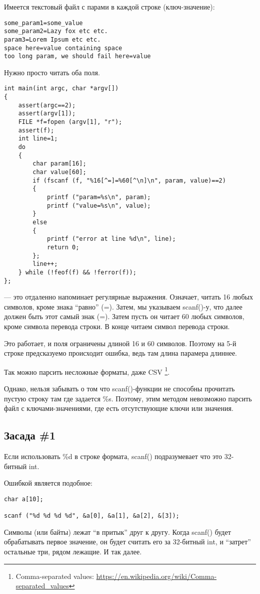 Имеется текстовый файл с парами в каждой строке (ключ-значение):

\begin{lstlisting}
some_param1=some_value
some_param2=Lazy fox etc etc.
param3=Lorem Ipsum etc etc.
space here=value containing space
too long param, we should fail here=value
\end{lstlisting}

Нужно просто читать оба поля.

\begin{lstlisting}
int main(int argc, char *argv[])
{
	assert(argc==2);
	assert(argv[1]);
	FILE *f=fopen (argv[1], "r");
	assert(f);
	int line=1;
	do
	{
		char param[16];
		char value[60];
		if (fscanf (f, "%16[^=]=%60[^\n]\n", param, value)==2)
		{
			printf ("param=%s\n", param);
			printf ("value=%s\n", value);
		}
		else
		{
			printf ("error at line %d\n", line);
			return 0;
		};
		line++;
	} while (!feof(f) && !ferror(f));
};
\end{lstlisting}

 --- это отдаленно напоминает регулярные выражения. Означает, читать 16 любых символов, кроме
знака ``равно'' (=). Затем, мы указываем scanf()-у, что далее должен быть этот самый знак (=). Затем
пусть он читает 60 любых символов, кроме символа перевода строки. В конце читаем символ перевода строки.

Это работает, и поля ограничены длиной 16 и 60 символов. Поэтому на 5-й строке предсказуемо происходит ошибка,
ведь там длина парамера длиннее.

Так можно парсить несложные форматы, даже CSV
\footnote{Comma-separated values: \url{https://en.wikipedia.org/wiki/Comma-separated_values}}.

Однако, нельзя забывать о том что scanf()-функции не способны прочитать пустую строку там где задается \%s.
Поэтому, этим методом невозможно парсить файл с ключами-значениями, где есть отсутствующие ключи или значения.

\subsection{Засада \#1}

Если использовать \%d в строке формата, scanf() подразумевает что это 32-битный int. 

Ошибкой является подобное:

\begin{lstlisting}
char a[10];

scanf ("%d %d %d %d", &a[0], &a[1], &a[2], &[3]);
\end{lstlisting}

Символы (или байты) лежат ``в притык'' друг к другу. Когда scanf() будет обрабатывать первое значение, он будет считать
его за 32-битный int, и ``затрет'' остальные три, рядом лежащие. И так далее.
